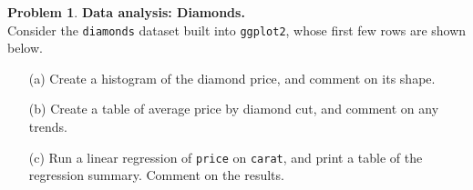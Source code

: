 \documentclass[11pt,letterpaper,english,oneside]{article} %
\theoremstyle{definition} %
\newtheorem{problem}{Problem}
\newenvironment{prob}{\clearpage \begin{problem}\hspace{0pt}}{\end{problem}}
\begin{document}
\begin{prob} \textbf{Data analysis: Diamonds.} \\

\noindent Consider the \texttt{diamonds} dataset built into \texttt{ggplot2}, whose first few rows are shown below.



\begin{enumerate}
\item[(a)] Create a histogram of the diamond price, and comment on its shape.
\item[(b)] Create a table of average price by diamond cut, and comment on any trends.
\item[(c)] Run a linear regression of \texttt{price} on \texttt{carat}, and print a table of the regression summary. Comment on the results.
\end{enumerate}

\end{prob}
\end{document}
